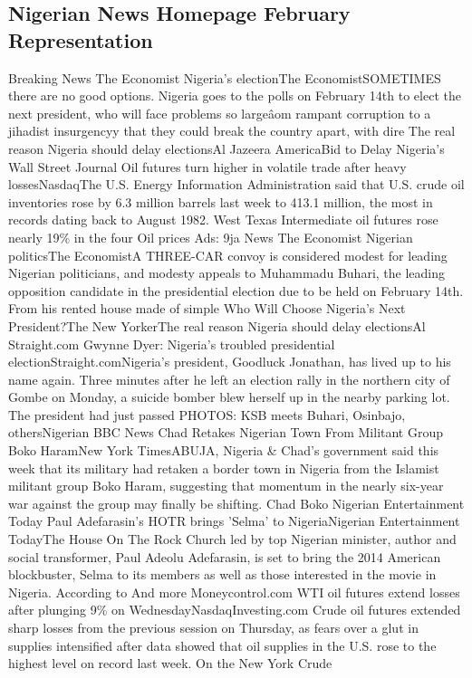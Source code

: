 \documentclass[a4paper,12pt]{article}
\begin{document}
\begin{appendices}
\subsection{Nigerian News Homepage February Representation}
Breaking News
The Economist Nigeria's electionThe EconomistSOMETIMES there are no good options. Nigeria goes to the polls on February 14th to elect the next president, who will face problems so largeâom rampant corruption to a jihadist insurgencyy that they could break the country apart, with dire The real reason Nigeria should delay electionsAl Jazeera AmericaBid to Delay Nigeria's
Wall Street Journal Oil futures turn higher in volatile trade after heavy lossesNasdaqThe U.S. Energy Information Administration said that U.S. crude oil inventories rose by 6.3 million barrels last week to 413.1 million, the most in records dating back to August 1982. West Texas Intermediate oil futures rose nearly 19\% in the four Oil prices
Ads:
9ja News
The Economist Nigerian politicsThe EconomistA THREE-CAR convoy is considered modest for leading Nigerian politicians, and modesty appeals to Muhammadu Buhari, the leading opposition candidate in the presidential election due to be held on February 14th. From his rented house made of simple Who Will Choose Nigeria's Next President?The New YorkerThe real reason Nigeria should delay electionsAl
Straight.com Gwynne Dyer: Nigeria's troubled presidential electionStraight.comNigeria's president, Goodluck Jonathan, has lived up to his name again. Three minutes after he left an election rally in the northern city of Gombe on Monday, a suicide bomber blew herself up in the nearby parking lot. The president had just passed PHOTOS: KSB meets Buhari, Osinbajo, othersNigerian
BBC News Chad Retakes Nigerian Town From Militant Group Boko HaramNew York TimesABUJA, Nigeria \& Chad's government said this week that its military had retaken a border town in Nigeria from the Islamist militant group Boko Haram, suggesting that momentum in the nearly six-year war against the group may finally be shifting. Chad Boko
Nigerian Entertainment Today Paul Adefarasin's HOTR brings 'Selma' to NigeriaNigerian Entertainment TodayThe House On The Rock Church led by top Nigerian minister, author and social transformer, Paul Adeolu Adefarasin, is set to bring the 2014 American blockbuster, Selma to its members as well as those interested in the movie in Nigeria. According to And more
Moneycontrol.com WTI oil futures extend losses after plunging 9\% on WednesdayNasdaqInvesting.com Crude oil futures extended sharp losses from the previous session on Thursday, as fears over a glut in supplies intensified after data showed that oil supplies in the U.S. rose to the highest level on record last week. On the New York Crude

\end{appendices}
\end{document}
